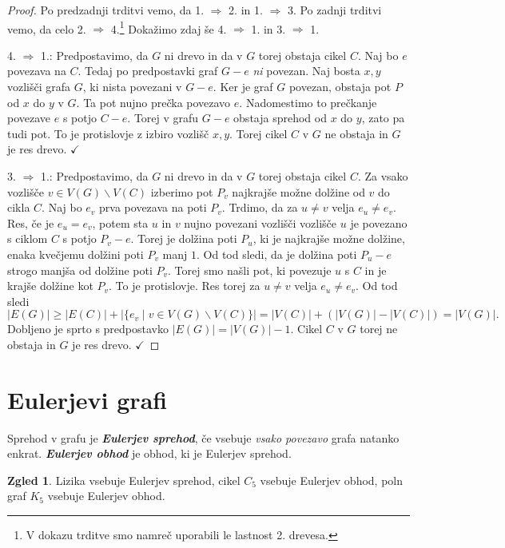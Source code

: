 \documentclass[11pt]{book}
\def\definicija{\color{rdeca}\bf\em}
\def\kljuka{$\checkmark$}
\theoremstyle{definition}
\theoremstyle{zgled}
\newtheorem*{zgled}{Zgled}
\theoremstyle{odprtproblem}
\theoremstyle{domacanaloga}
\newenvironment{dokaz}
    {\color{siva}\begin{proof}}
    {\end{proof}}
\theoremstyle{izrek}
\begin{document}
\begin{dokaz}
Po predzadnji trditvi vemo, da 1. $\Rightarrow$ 2. in 1. $\Rightarrow$ 3. Po zadnji trditvi vemo, da celo 2. $\Rightarrow$ 4.\footnote{V dokazu trditve smo namreč uporabili le lastnost 2. drevesa.} Dokažimo zdaj še 4. $\Rightarrow$ 1. in 3. $\Rightarrow$ 1.

4. $\Rightarrow$ 1.: Predpostavimo, da $G$ ni drevo in da v $G$ torej obstaja cikel $C$. Naj bo $e$ povezava na $C$. Tedaj po predpostavki graf $G - e$ \emph{ni} povezan. Naj bosta $x,y$ vozlišči grafa $G$, ki nista povezani v $G - e$. Ker je graf $G$ povezan, obstaja pot $P$ od $x$ do $y$ v $G$. Ta pot nujno prečka povezavo $e$. Nadomestimo to prečkanje povezave $e$ s potjo $C - e$. Torej v grafu $G - e$ obstaja sprehod od $x$ do $y$, zato pa tudi pot. To je protislovje z izbiro vozlišč $x,y$. Torej cikel $C$ v $G$ ne obstaja in $G$ je res drevo. \kljuka

3. $\Rightarrow$ 1.: Predpostavimo, da $G$ ni drevo in da v $G$ torej obstaja cikel $C$. Za vsako vozlišče $v \in V(G) \backslash V(C)$ izberimo pot $P_v$ najkrajše možne dolžine od $v$ do cikla $C$. Naj bo $e_v$ prva povezava na poti $P_v$. Trdimo, da za $u \neq v$ velja $e_u \neq e_v$. Res, če je $e_u = e_v$, potem sta $u$ in $v$ nujno povezani vozlišči vozlišče $u$ je povezano s ciklom $C$ s potjo $P_v - e$. Torej je dolžina poti $P_u$, ki je najkrajše možne dolžine, enaka kvečjemu dolžini poti $P_v$ manj $1$. Od tod sledi, da je dolžina poti $P_u - e$ strogo manjša od dolžine poti $P_v$. Torej smo našli pot, ki povezuje $u$ s $C$ in je krajše dolžine kot $P_v$. To je protislovje. Res torej za $u \neq v$ velja $e_u \neq e_v$. Od tod sledi
\[
    |E(G)| \geq |E(C)| + |\{ e_v \mid v \in V(G) \backslash V(C) \}|
    = |V(C)| + (|V(G)| - |V(C)|)
    = |V(G)|.
\]
Dobljeno je sprto s predpostavko $|E(G)| = |V(G)| - 1$. Cikel $C$ v $G$ torej ne obstaja in $G$ je res drevo. \kljuka
\end{dokaz}


\section{Eulerjevi grafi}

Sprehod v grafu je {\definicija Eulerjev sprehod}, če vsebuje \emph{vsako povezavo} grafa natanko enkrat. {\definicija Eulerjev obhod} je obhod, ki je Eulerjev sprehod.

\begin{zgled}
Lizika vsebuje Eulerjev sprehod, cikel $C_5$ vsebuje Eulerjev obhod, poln graf $K_5$ vsebuje Eulerjev obhod.
\end{zgled}
\end{document}
